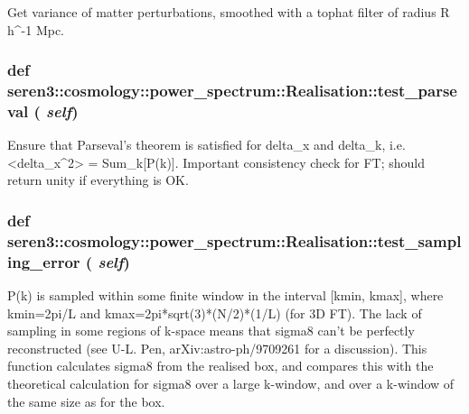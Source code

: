 \label{classseren3_1_1cosmology_1_1power__spectrum_1_1Realisation_a7aa3738c4f9874c56702655c77463f98}
\begin{DoxyVerb}Get variance of matter perturbations, smoothed with a tophat filter 
   of radius R h^-1 Mpc.\end{DoxyVerb}
 \hypertarget{classseren3_1_1cosmology_1_1power__spectrum_1_1Realisation_a3fa53f286013d68966617cb9b360e4bf}{
\subsubsection[{test\_\-parseval}]{\setlength{\rightskip}{0pt plus 5cm}def seren3::cosmology::power\_\-spectrum::Realisation::test\_\-parseval ( {\em self})}}
\label{classseren3_1_1cosmology_1_1power__spectrum_1_1Realisation_a3fa53f286013d68966617cb9b360e4bf}
\begin{DoxyVerb}Ensure that Parseval's theorem is satisfied for delta_x and delta_k, 
   i.e. <delta_x^2> = Sum_k[P(k)]. Important consistency check for FT;
   should return unity if everything is OK.
\end{DoxyVerb}
 \hypertarget{classseren3_1_1cosmology_1_1power__spectrum_1_1Realisation_a5db10734093eab1e21e2e1162375ec65}{
\subsubsection[{test\_\-sampling\_\-error}]{\setlength{\rightskip}{0pt plus 5cm}def seren3::cosmology::power\_\-spectrum::Realisation::test\_\-sampling\_\-error ( {\em self})}}
\label{classseren3_1_1cosmology_1_1power__spectrum_1_1Realisation_a5db10734093eab1e21e2e1162375ec65}
\begin{DoxyVerb}P(k) is sampled within some finite window in the interval 
   [kmin, kmax], where kmin=2pi/L and kmax=2pi*sqrt(3)*(N/2)*(1/L) 
   (for 3D FT). The lack of sampling in some regions of k-space means 
   that sigma8 can't be perfectly reconstructed (see U-L. Pen, 
   arXiv:astro-ph/9709261 for a discussion).
   This function calculates sigma8 from the realised box, and compares 
   this with the theoretical calculation for sigma8 over a large 
   k-window, and over a k-window of the same size as for the box.
\end{DoxyVerb}
